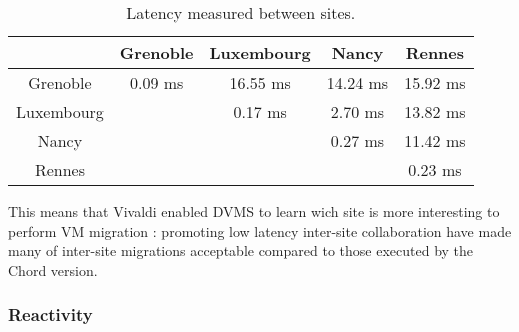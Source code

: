 \begin{table}

  \begin{center}
    \begin{tabular}{|c|c|c|c|c|}   

      \hline \multicolumn{1}{|p{2cm}|}{ } & \multicolumn{1}{|p{2cm}|}{\centering Grenoble }  & \multicolumn{1}{|p{2cm}|}{\centering Luxembourg } & \multicolumn{1}{|p{2cm}|}{\centering Nancy }& \multicolumn{1}{|p{2cm}|}{\centering Rennes } \\

      \hline
      Grenoble & 0.09 ms & 16.55 ms & 14.24 ms & 15.92 ms \\

      \hline
      Luxembourg &  & 0.17 ms & 2.70 ms & 13.82 ms \\

      \hline
      Nancy & &  & 0.27 ms & 11.42 ms \\

      \hline
      Rennes &  &  &  & 0.23 ms \\

      \hline
    \end{tabular}
  \end{center}
  \caption{\label{latency_table} Latency measured between sites.}
\end{table}

This means that Vivaldi enabled DVMS to learn wich site is more interesting to
perform VM migration : promoting low latency inter-site collaboration have made 
many of inter-site migrations acceptable compared to those executed by the Chord
version.


\subsubsection{Reactivity}

